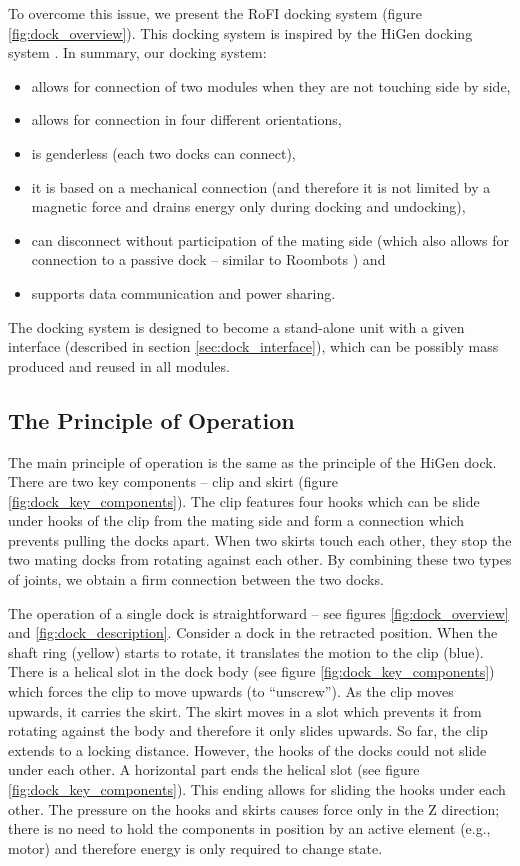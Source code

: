 To overcome this issue, we present the RoFI docking system (figure
\ref{fig:dock_overview}). This docking system is inspired by the HiGen docking
system \cite{parrott_higen:_2014}. In summary, our docking system:
\begin{itemize}
    \item allows for connection of two modules when they are not touching side
    by side,
    \item allows for connection in four different orientations,
    \item is genderless (each two docks can connect),
    \item it is based on a mechanical connection (and therefore it is not
    limited by a magnetic force and drains energy only during docking and
    undocking),
    \item can disconnect without participation of the mating side (which also
    allows for connection to a passive dock -- similar to Roombots
    \cite{bonardi_locomotion_2012}) and
    \item supports data communication and power sharing.
\end{itemize}

The docking system is designed to become a stand-alone unit with a given
interface (described in section \ref{sec:dock_interface}), which can be possibly
mass produced and reused in all modules.

\subsection{The Principle of Operation}

The main principle of operation is the same as the principle of the HiGen dock.
There are two key components -- clip and skirt (figure
\ref{fig:dock_key_components}). The clip features four hooks which can be
slide under hooks of the clip from the mating side and form a connection which
prevents pulling the docks apart. When two skirts touch each other, they stop
the two mating docks from rotating against each other. By combining these two
types of joints, we obtain a firm connection between the two docks.

The operation of a single dock is straightforward -- see figures
\ref{fig:dock_overview} and \ref{fig:dock_description}. Consider a dock in the
retracted position. When the shaft ring (yellow) starts to rotate, it translates
the motion to the clip (blue). There is a helical slot in the dock body (see
figure \ref{fig:dock_key_components}) which forces the clip to move upwards (to
``unscrew''). As the clip moves upwards, it carries the skirt. The skirt moves
in a slot which prevents it from rotating against the body and therefore it only
slides upwards. So far, the clip extends to a locking distance. However, the
hooks of the docks could not slide under each other. A horizontal part ends the
helical slot (see figure \ref{fig:dock_key_components}). This ending allows for
sliding the hooks under each other. The pressure on the hooks and skirts causes
force only in the Z direction; there is no need to hold the components in
position by an active element (e.g., motor) and therefore energy is only
required to change state.

